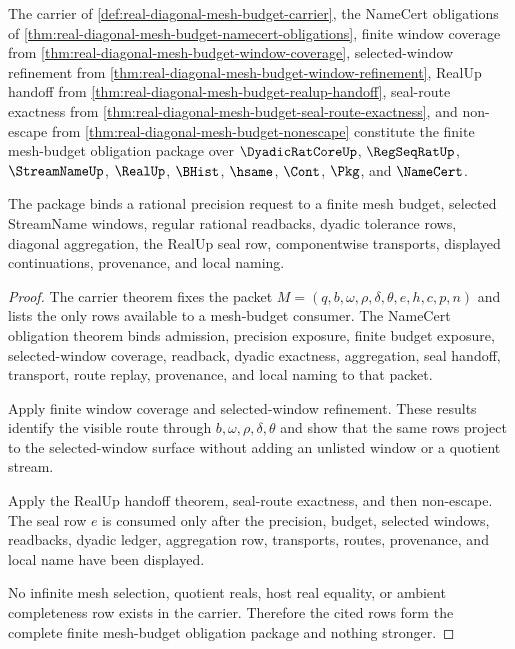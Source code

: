 \begin{theorem}
\label{thm:real-diagonal-mesh-budget-obligation-closure-package}
The carrier of \autoref{def:real-diagonal-mesh-budget-carrier}, the NameCert obligations of \autoref{thm:real-diagonal-mesh-budget-namecert-obligations}, finite window coverage from \autoref{thm:real-diagonal-mesh-budget-window-coverage}, selected-window refinement from \autoref{thm:real-diagonal-mesh-budget-window-refinement}, RealUp handoff from \autoref{thm:real-diagonal-mesh-budget-realup-handoff}, seal-route exactness from \autoref{thm:real-diagonal-mesh-budget-seal-route-exactness}, and non-escape from \autoref{thm:real-diagonal-mesh-budget-nonescape} constitute the finite mesh-budget obligation package over $\DyadicRatCoreUp$, $\RegSeqRatUp$, $\StreamNameUp$, $\RealUp$, $\BHist$, $\hsame$, $\Cont$, $\Pkg$, and $\NameCert$.

The package binds a rational precision request to a finite mesh budget, selected StreamName windows, regular rational readbacks, dyadic tolerance rows, diagonal aggregation, the RealUp seal row, componentwise transports, displayed continuations, provenance, and local naming.
\end{theorem}
\begin{proof}
The carrier theorem fixes the packet $M=(q,b,\omega,\rho,\delta,\theta,e,h,c,p,n)$ and lists the only rows available to a mesh-budget consumer. The NameCert obligation theorem binds admission, precision exposure, finite budget exposure, selected-window coverage, readback, dyadic exactness, aggregation, seal handoff, transport, route replay, provenance, and local naming to that packet.

Apply finite window coverage and selected-window refinement. These results identify the visible route through $b,\omega,\rho,\delta,\theta$ and show that the same rows project to the selected-window surface without adding an unlisted window or a quotient stream.

Apply the RealUp handoff theorem, seal-route exactness, and then non-escape. The seal row $e$ is consumed only after the precision, budget, selected windows, readbacks, dyadic ledger, aggregation row, transports, routes, provenance, and local name have been displayed.

No infinite mesh selection, quotient reals, host real equality, or ambient completeness row exists in the carrier. Therefore the cited rows form the complete finite mesh-budget obligation package and nothing stronger.
\end{proof}

